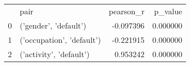 \begin{tabular}{llrr}
 & pair & pearson\_r & p\_value \\
0 & ('gender', 'default') & -0.097396 & 0.000000 \\
1 & ('occupation', 'default') & -0.221915 & 0.000000 \\
2 & ('activity', 'default') & 0.953242 & 0.000000 \\
\end{tabular}
